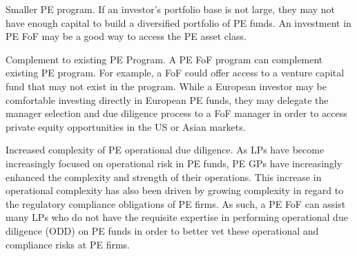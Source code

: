 \documentclass[11pt]{article}
\begin{document}
Smaller PE program. If an investor's portfolio base is not large, they may not have enough capital to build a diversified portfolio of PE funds. An investment in PE FoF may be a good way to access the PE asset class.

Complement to existing PE Program. A PE FoF program can complement existing PE program. For example, a FoF could offer access to a venture capital fund that may not exist in the program. While a European investor may be comfortable investing directly in European PE funds, they may delegate the manager selection and due diligence process to a FoF manager in order to access private equity opportunities in the US or Asian markets.

Increased complexity of PE operational due diligence. As LPs have become increasingly focused on operational risk in PE funds, PE GPs have increasingly enhanced the complexity and strength of their operations. This increase in operational complexity has also been driven by growing complexity in regard to the regulatory compliance obligations of PE firms. As such, a PE FoF can assist many LPs who do not have the requisite expertise in performing operational due diligence (ODD) on PE funds in order to better vet these operational and compliance risks at PE firms.
\end{document}
